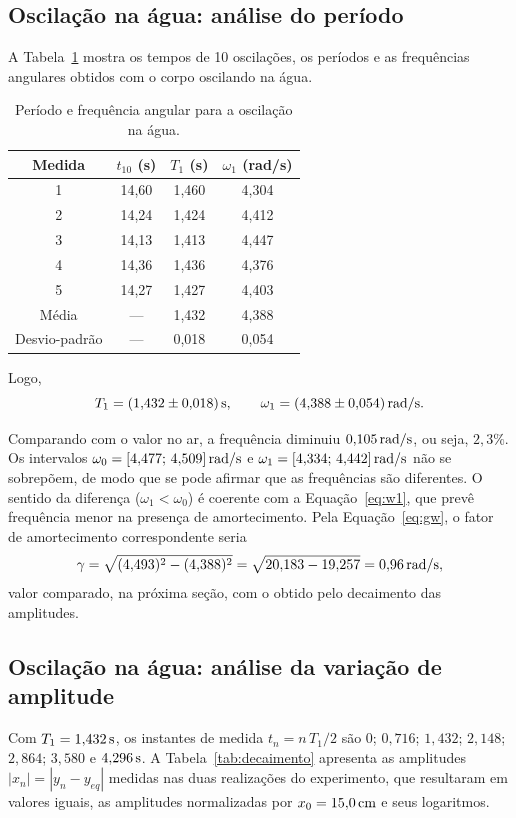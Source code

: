 \subsection{Oscilação na água: análise do período}

A Tabela~\ref{tab:agua} mostra os tempos de 10 oscilações, os períodos e as frequências angulares obtidos com o corpo oscilando na água.

\begin{table}[H]
\centering
\caption{Período e frequência angular para a oscilação na água.}
\label{tab:agua}
\begin{tabular}{cccc}
\toprule
Medida & $t_{10}$ (s) & $T_1$ (s) & $\omega_1$ (rad/s) \\
\midrule
1 & 14,60 & 1,460 & 4,304 \\
2 & 14,24 & 1,424 & 4,412 \\
3 & 14,13 & 1,413 & 4,447 \\
4 & 14,36 & 1,436 & 4,376 \\
5 & 14,27 & 1,427 & 4,403 \\
\midrule
Média & --- & 1,432 & 4,388 \\
Desvio-padrão & --- & 0,018 & 0,054 \\
\bottomrule
\end{tabular}
\end{table}

Logo,
\[
T_1=(1{,}432\pm0{,}018)\,\mathrm{s},
\qquad
\omega_1=(4{,}388\pm0{,}054)\,\mathrm{rad/s}.
\]

Comparando com o valor no ar, a frequência diminuiu $0{,}105\,\mathrm{rad/s}$, ou seja, $2{,}3\%$. Os intervalos $\omega_0=[4{,}477;\,4{,}509]\,\mathrm{rad/s}$ e $\omega_1=[4{,}334;\,4{,}442]\,\mathrm{rad/s}$ não se sobrepõem, de modo que se pode afirmar que as frequências são diferentes. O sentido da diferença ($\omega_1<\omega_0$) é coerente com a Equação~\eqref{eq:w1}, que prevê frequência menor na presença de amortecimento. Pela Equação~\eqref{eq:gw}, o fator de amortecimento correspondente seria
\[
\gamma=\sqrt{(4{,}493)^2-(4{,}388)^2}=\sqrt{20{,}183-19{,}257}=0{,}96\,\mathrm{rad/s},
\]
valor comparado, na próxima seção, com o obtido pelo decaimento das amplitudes.

\subsection{Oscilação na água: análise da variação de amplitude}

Com $T_1=1{,}432\,\mathrm{s}$, os instantes de medida $t_n=n\,T_1/2$ são $0$; $0{,}716$; $1{,}432$; $2{,}148$; $2{,}864$; $3{,}580$ e $4{,}296\,\mathrm{s}$. A Tabela~\ref{tab:decaimento} apresenta as amplitudes $|x_n|=|y_n-y_{eq}|$ medidas nas duas realizações do experimento, que resultaram em valores iguais, as amplitudes normalizadas por $x_0=15{,}0\,\mathrm{cm}$ e seus logaritmos.

